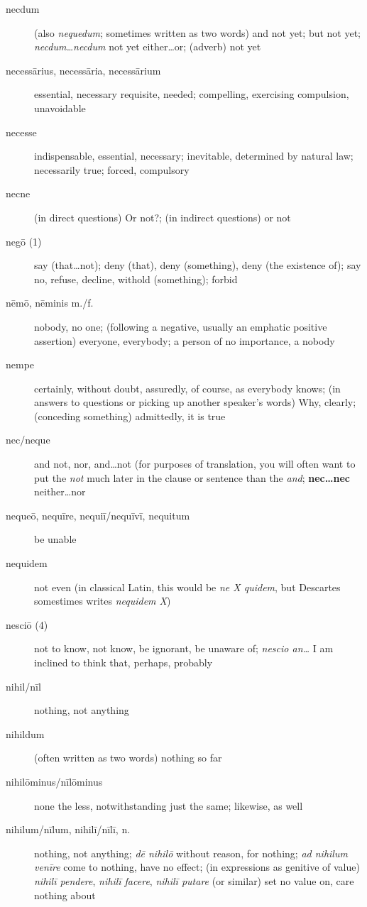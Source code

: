 \begin{description}
    \item[necdum] (also \textit{nequedum}; sometimes written as two words) and not yet; but not yet; \textit{necdum\dots necdum} not yet either\dots or; (adverb) not yet
    \item[necessārius, necessāria, necessārium] essential, necessary requisite, needed; compelling, exercising compulsion, unavoidable
    \item[necesse] indispensable, essential, necessary; inevitable, determined by natural law; necessarily true; forced, compulsory
    \item[necne] (in direct questions) Or not?; (in indirect questions) or not
    \item[negō (1)] say (that\dots not); deny (that), deny (something), deny (the existence of); say no, refuse, decline, withold (something); forbid
    \item[nēmō, nēminis m./f.] nobody,  no one; (following a negative, usually an emphatic positive assertion) everyone, everybody; a person of no importance, a nobody
    \item[nempe] certainly, without doubt, assuredly, of course, as everybody knows; (in answers to questions or picking up another speaker's words) Why, clearly; (conceding something) admittedly, it is true
    \item[nec/neque] and not, nor, and\dots not (for purposes of translation, you will often want to put the \textit{not} much later in the clause or sentence than the \textit{and}; \textbf{nec\dots nec} neither\dots nor
    \item[nequeō, nequīre, nequiī/nequīvī, nequitum] be unable
    \item[nequidem] not even (in classical Latin, this would be \textit{ne X quidem}, but Descartes somestimes writes \textit{nequidem X})
    \item[nesciō (4)] not to know, not know, be ignorant, be unaware of; \textit{nescio an\dots} I am inclined to think that, perhaps, probably
    \item[nihil/nīl] nothing, not anything
    \item[nihildum] (often written as two words) nothing so far
    \item[nihilōminus/nīlōminus] none the less, notwithstanding just the same; likewise, as well
    \item[nihilum/nīlum, nihilī/nīlī, n.] nothing, not anything; \textit{dē nihilō} without reason, for nothing; \textit{ad nihilum venīre} come to nothing, have no effect; (in expressions as genitive of value) \textit{nihilī pendere}, \textit{nihilī facere}, \textit{nihilī putare} (or similar) set no value on, care nothing about

\end{description}
